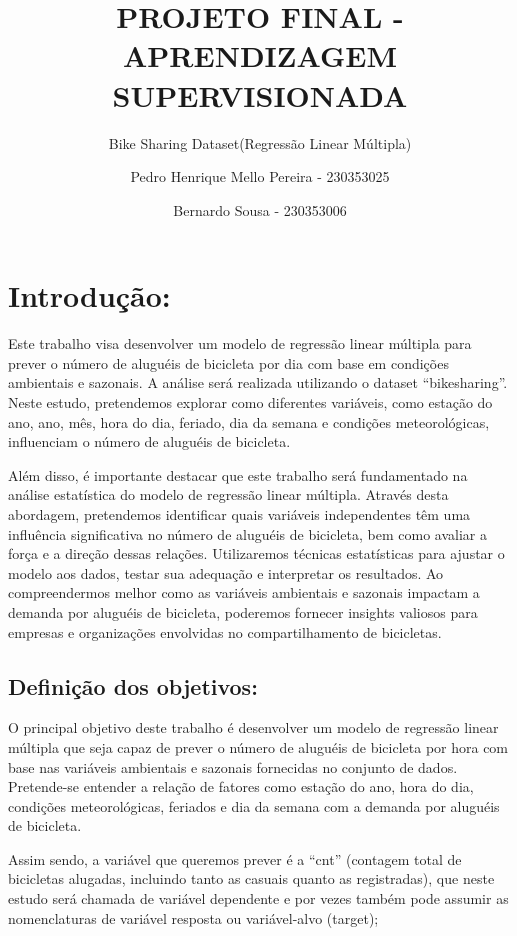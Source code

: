\documentclass[
  letterpaper,
  DIV=11,
  numbers=noendperiod]{scrartcl}
\title{PROJETO FINAL - APRENDIZAGEM SUPERVISIONADA}
\subtitle{Bike Sharing Dataset(Regressão Linear Múltipla)}
\author{Pedro Henrique Mello Pereira - 230353025 \and Bernardo Sousa -
230353006}
\date{}
\renewcommand*\contentsname{Table of contents}
\newcommand\contentsname{Table of contents}
\begin{document}
\maketitle

\renewcommand*\contentsname{Table of contents}
{
\hypersetup{linkcolor=}
\setcounter{tocdepth}{3}
\tableofcontents
}
\newpage{}

\section{Introdução:}\label{introduuxe7uxe3o}

Este trabalho visa desenvolver um modelo de regressão linear múltipla
para prever o número de aluguéis de bicicleta por dia com base em
condições ambientais e sazonais. A análise será realizada utilizando o
dataset ``bikesharing''. Neste estudo, pretendemos explorar como
diferentes variáveis, como estação do ano, ano, mês, hora do dia,
feriado, dia da semana e condições meteorológicas, influenciam o número
de aluguéis de bicicleta.

Além disso, é importante destacar que este trabalho será fundamentado na
análise estatística do modelo de regressão linear múltipla. Através
desta abordagem, pretendemos identificar quais variáveis independentes
têm uma influência significativa no número de aluguéis de bicicleta, bem
como avaliar a força e a direção dessas relações. Utilizaremos técnicas
estatísticas para ajustar o modelo aos dados, testar sua adequação e
interpretar os resultados. Ao compreendermos melhor como as variáveis
ambientais e sazonais impactam a demanda por aluguéis de bicicleta,
poderemos fornecer insights valiosos para empresas e organizações
envolvidas no compartilhamento de bicicletas.

\subsection{Definição dos
objetivos:}\label{definiuxe7uxe3o-dos-objetivos}

O principal objetivo deste trabalho é desenvolver um modelo de regressão
linear múltipla que seja capaz de prever o número de aluguéis de
bicicleta por hora com base nas variáveis ambientais e sazonais
fornecidas no conjunto de dados. Pretende-se entender a relação de
fatores como estação do ano, hora do dia, condições meteorológicas,
feriados e dia da semana com a demanda por aluguéis de bicicleta.

Assim sendo, a variável que queremos prever é a ``cnt'' (contagem total
de bicicletas alugadas, incluindo tanto as casuais quanto as
registradas), que neste estudo será chamada de variável dependente e por
vezes também pode assumir as nomenclaturas de variável resposta ou
variável-alvo (target);
\end{document}
